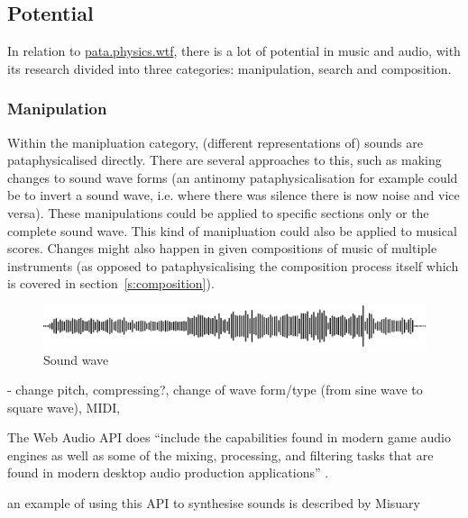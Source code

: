\subsection{Potential}
\label{s:potential}

In relation to \url{pata.physics.wtf}, there is a lot of potential in music and audio, with its research divided into three categories: manipulation, search and composition. 

\subsubsection{Manipulation}

Within the manipluation category, (different representations of) sounds are pataphysicalised directly. There are several approaches to this, such as making changes to sound wave forms (an antinomy pataphysicalisation for example could be to invert a sound wave, i.e. where there was silence there is now noise and vice versa). These manipulations could be applied to specific sections only or the complete sound wave. This kind of manipluation could also be applied to musical scores. Changes might also happen in given compositions of music of multiple instruments (as opposed to pataphysicalising the composition process itself which is covered in section~\ref{s:composition}).

\begin{figure}[!htbp]
\centering
  \includegraphics[width=\linewidth]{simplewave.pdf}
\caption{Sound wave}
\end{figure}


- change pitch, compressing?, change of wave form/type (from sine wave to square wave), MIDI,  




The Web Audio API does ``include the capabilities found in modern game audio engines as well as some of the mixing, processing, and filtering tasks that are found in modern desktop audio production applications'' \autocite{Adenot2017}.

an example of using this API to synthesise sounds is described by Misuary \autocite{Misuary2016}



\autocite{soundcloud}




